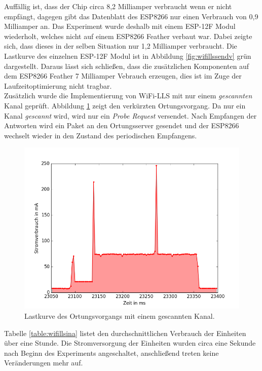 Auffällig ist, dass der Chip circa 8,2 Milliamper verbraucht wenn er nicht empfängt, dagegen gibt das Datenblatt des ESP8266 nur einen Verbrauch von 0,9 Milliamper an.
Das Experiment wurde deshalb mit einem ESP-12F Modul wiederholt, welches nicht auf einem ESP8266 Feather verbaut war. 
Dabei zeigte sich, dass dieses in der selben Situation nur 1,2 Milliamper verbraucht.
Die Lastkurve des einzelnen ESP-12F Modul ist in Abbildung \ref{fig:wifillssendv} grün dargestellt.
Daraus lässt sich schließen, dass die zusätzlichen Komponenten auf dem ESP8266 Feather 7 Milliamper Vebrauch erzeugen, dies ist im Zuge der Laufzeitoptimierung nicht tragbar.\\
Zusätzlich wurde die Implementierung von WiFi-LLS mit nur einem \emph{gescannten} Kanal geprüft.
Abbildung \ref{fig:wifills1chsend} zeigt den verkürzten Ortungsvorgang.
Da nur ein Kanal \emph{gescannt} wird, wird nur ein \emph{Probe Request} versendet.
Nach Empfangen der Antworten wird ein Paket an den Ortungsserver gesendet und der ESP8266 wechselt wieder in den Zustand des periodischen Empfangens.\\

\begin{figure}[h!]
  \centering
	\includegraphics[width=\textwidth]{plots/wifills1chsend.png}
  \caption{Lastkurve des Ortungsvorgangs mit einem gescannten Kanal.}
  \label{fig:wifills1chsend}
\end{figure}

Tabelle \ref{table:wifillsina} listet den durchschnittlichen Verbrauch der Einheiten über eine Stunde.
Die Stromversorgung der Einheiten wurden circa eine Sekunde nach Beginn des Experiments angeschaltet, anschließend treten keine Veränderungen mehr auf.

